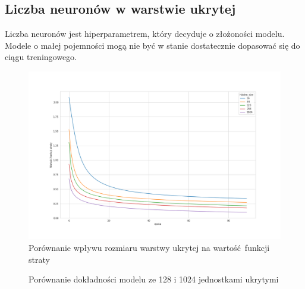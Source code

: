 \documentclass{article}
\begin{document}
\subsection{Liczba neuronów w warstwie ukrytej}
Liczba neuronów jest hiperparametrem, który decyduje o złożoności modelu.
Modele o małej pojemności mogą nie być w stanie dostatecznie dopasować się do 
ciągu treningowego.

\begin{figure}[H]
  \centering
  \includegraphics[width=\textwidth]{images/hidden_size_comp.png}
  \caption{Porównanie wpływu rozmiaru warstwy ukrytej na wartość funkcji straty}
\end{figure}
\begin{figure}[H]
    \centering
  \caption{Porównanie dokładności modelu ze 128 i 1024 jednostkami ukrytymi}
\end{figure}
\end{document}
